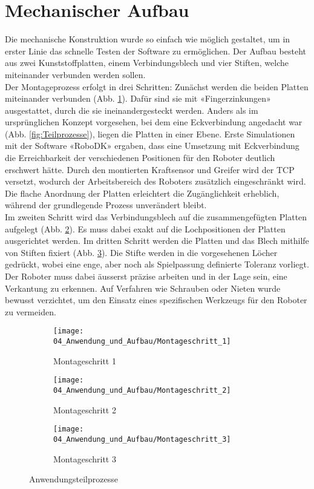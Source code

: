 \section{Mechanischer Aufbau} \label{Mechanischer_Aufbau}
	Die mechanische Konstruktion wurde so einfach wie möglich gestaltet, um in erster Linie das schnelle Testen der Software zu ermöglichen. Der Aufbau besteht aus zwei Kunststoffplatten, einem Verbindungsblech und vier Stiften, welche miteinander verbunden werden sollen. 
	\\
	Der Montageprozess erfolgt in drei Schritten: Zunächst werden die beiden Platten miteinander verbunden (Abb. \ref{fig:Montageschritt 1}). Dafür sind sie mit «Fingerzinkungen» ausgestattet, durch die sie ineinandergesteckt werden. Anders als im ursprünglichen Konzept vorgesehen, bei dem eine Eckverbindung angedacht war (Abb. \ref{fig:Teilprozesse}), liegen die Platten in einer Ebene. Erste Simulationen mit der Software «RoboDK» ergaben, dass eine Umsetzung mit Eckverbindung die Erreichbarkeit der verschiedenen Positionen für den Roboter deutlich erschwert hätte. Durch den montierten Kraftsensor und Greifer wird der \Gls{TCP} versetzt, wodurch der Arbeitsbereich des Roboters zusätzlich eingeschränkt wird. Die flache Anordnung der Platten erleichtert die Zugänglichkeit erheblich, während der grundlegende Prozess unverändert bleibt.
	\\
	Im zweiten Schritt wird das Verbindungsblech auf die zusammengefügten Platten aufgelegt (Abb. \ref{fig:Montageschritt 2}). Es muss dabei exakt auf die Lochpositionen der Platten ausgerichtet werden. Im dritten Schritt werden die Platten und das Blech mithilfe von Stiften fixiert (Abb. \ref{fig:Montageschritt 3}). Die Stifte werden in die vorgesehenen Löcher gedrückt, wobei eine enge, aber noch als Spielpassung definierte Toleranz vorliegt. Der Roboter muss dabei äusserst präzise arbeiten und in der Lage sein, eine Verkantung zu erkennen. Auf Verfahren wie Schrauben oder Nieten wurde bewusst verzichtet, um den Einsatz eines spezifischen Werkzeugs für den Roboter zu vermeiden.
	
	 \begin{figure}[h!]
		\centering
		\begin{subfigure}[b]{0.3\textwidth}
			\centering
			\texttt{[image: 04\_Anwendung\_und\_Aufbau/Montageschritt\_1]}
			\caption{Montageschritt 1}
			\label{fig:Montageschritt 1}
		\end{subfigure}
		\hfill
		\begin{subfigure}[b]{0.3\textwidth}
			\centering
			\texttt{[image: 04\_Anwendung\_und\_Aufbau/Montageschritt\_2]}
			\caption{Montageschritt 2}
			\label{fig:Montageschritt 2}
		\end{subfigure}
		\hfill
		\begin{subfigure}[b]{0.3\textwidth}
			\centering
			\texttt{[image: 04\_Anwendung\_und\_Aufbau/Montageschritt\_3]}
			\caption{Montageschritt 3}
			\label{fig:Montageschritt 3}
		\end{subfigure}
		\caption{Anwendungsteilprozesse}
		\label{fig:Montageschritte}
	\end{figure}
	
